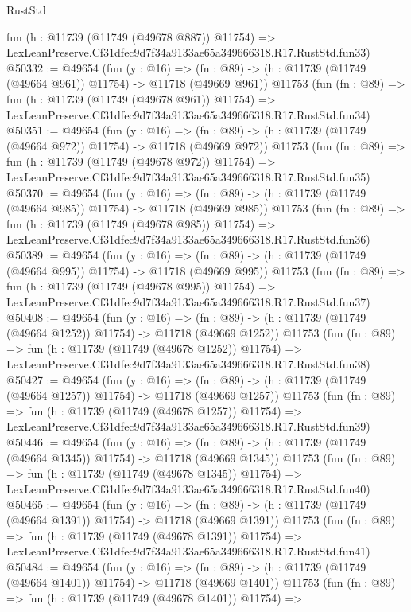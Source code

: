 \begin{lexlean}{RustStd}
\begin{coremodule}
    fun (h : @11739 (@11749 (@49678 @887)) @11754) =>
    LexLeanPreserve.Cf31dfec9d7f34a9133ae65a349666318.R17.RustStd.fun33)
@50332 := @49654
    (fun (y : @16) =>
    (fn : @89) -> (h : @11739 (@11749 (@49664 @961)) @11754) -> @11718 (@49669 @961))
    @11753
    (fun (fn : @89) =>
    fun (h : @11739 (@11749 (@49678 @961)) @11754) =>
    LexLeanPreserve.Cf31dfec9d7f34a9133ae65a349666318.R17.RustStd.fun34)
@50351 := @49654
    (fun (y : @16) =>
    (fn : @89) -> (h : @11739 (@11749 (@49664 @972)) @11754) -> @11718 (@49669 @972))
    @11753
    (fun (fn : @89) =>
    fun (h : @11739 (@11749 (@49678 @972)) @11754) =>
    LexLeanPreserve.Cf31dfec9d7f34a9133ae65a349666318.R17.RustStd.fun35)
@50370 := @49654
    (fun (y : @16) =>
    (fn : @89) -> (h : @11739 (@11749 (@49664 @985)) @11754) -> @11718 (@49669 @985))
    @11753
    (fun (fn : @89) =>
    fun (h : @11739 (@11749 (@49678 @985)) @11754) =>
    LexLeanPreserve.Cf31dfec9d7f34a9133ae65a349666318.R17.RustStd.fun36)
@50389 := @49654
    (fun (y : @16) =>
    (fn : @89) -> (h : @11739 (@11749 (@49664 @995)) @11754) -> @11718 (@49669 @995))
    @11753
    (fun (fn : @89) =>
    fun (h : @11739 (@11749 (@49678 @995)) @11754) =>
    LexLeanPreserve.Cf31dfec9d7f34a9133ae65a349666318.R17.RustStd.fun37)
@50408 := @49654
    (fun (y : @16) =>
    (fn : @89) -> (h : @11739 (@11749 (@49664 @1252)) @11754) -> @11718 (@49669 @1252))
    @11753
    (fun (fn : @89) =>
    fun (h : @11739 (@11749 (@49678 @1252)) @11754) =>
    LexLeanPreserve.Cf31dfec9d7f34a9133ae65a349666318.R17.RustStd.fun38)
@50427 := @49654
    (fun (y : @16) =>
    (fn : @89) -> (h : @11739 (@11749 (@49664 @1257)) @11754) -> @11718 (@49669 @1257))
    @11753
    (fun (fn : @89) =>
    fun (h : @11739 (@11749 (@49678 @1257)) @11754) =>
    LexLeanPreserve.Cf31dfec9d7f34a9133ae65a349666318.R17.RustStd.fun39)
@50446 := @49654
    (fun (y : @16) =>
    (fn : @89) -> (h : @11739 (@11749 (@49664 @1345)) @11754) -> @11718 (@49669 @1345))
    @11753
    (fun (fn : @89) =>
    fun (h : @11739 (@11749 (@49678 @1345)) @11754) =>
    LexLeanPreserve.Cf31dfec9d7f34a9133ae65a349666318.R17.RustStd.fun40)
@50465 := @49654
    (fun (y : @16) =>
    (fn : @89) -> (h : @11739 (@11749 (@49664 @1391)) @11754) -> @11718 (@49669 @1391))
    @11753
    (fun (fn : @89) =>
    fun (h : @11739 (@11749 (@49678 @1391)) @11754) =>
    LexLeanPreserve.Cf31dfec9d7f34a9133ae65a349666318.R17.RustStd.fun41)
@50484 := @49654
    (fun (y : @16) =>
    (fn : @89) -> (h : @11739 (@11749 (@49664 @1401)) @11754) -> @11718 (@49669 @1401))
    @11753
    (fun (fn : @89) =>
    fun (h : @11739 (@11749 (@49678 @1401)) @11754) =>

\end{coremodule}
\end{lexlean}
